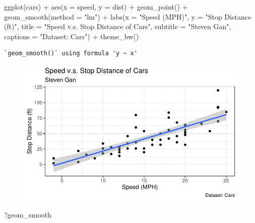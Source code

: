 \documentclass[
  letterpaper,
  DIV=11,
  numbers=noendperiod]{scrartcl}
\newenvironment{Shaded}{\begin{snugshade}}{\end{snugshade}}
\newcommand{\AttributeTok}[1]{\textcolor[rgb]{0.40,0.45,0.13}{#1}}
\newcommand{\FunctionTok}[1]{\textcolor[rgb]{0.28,0.35,0.67}{#1}}
\newcommand{\NormalTok}[1]{\textcolor[rgb]{0.00,0.23,0.31}{#1}}
\newcommand{\SpecialCharTok}[1]{\textcolor[rgb]{0.37,0.37,0.37}{#1}}
\newcommand{\StringTok}[1]{\textcolor[rgb]{0.13,0.47,0.30}{#1}}
\begin{document}
\begin{Shaded}
\begin{Highlighting}[]
\FunctionTok{ggplot}\NormalTok{(cars) }\SpecialCharTok{+} \FunctionTok{aes}\NormalTok{(}\AttributeTok{x =}\NormalTok{ speed, }\AttributeTok{y =}\NormalTok{ dist) }\SpecialCharTok{+} \FunctionTok{geom\_point}\NormalTok{() }\SpecialCharTok{+} \FunctionTok{geom\_smooth}\NormalTok{(}\AttributeTok{method =} \StringTok{"lm"}\NormalTok{) }\SpecialCharTok{+}
  \FunctionTok{labs}\NormalTok{(}\AttributeTok{x =} \StringTok{"Speed (MPH)"}\NormalTok{, }\AttributeTok{y =} \StringTok{"Stop Distance (ft)"}\NormalTok{,}
       \AttributeTok{title =} \StringTok{"Speed v.s. Stop Distance of Cars"}\NormalTok{,}
       \AttributeTok{subtitle =} \StringTok{"Steven Gan"}\NormalTok{,}
       \AttributeTok{captions =} \StringTok{"Dataset: Cars"}\NormalTok{) }\SpecialCharTok{+} \FunctionTok{theme\_bw}\NormalTok{()}
\end{Highlighting}
\end{Shaded}

\begin{verbatim}
`geom_smooth()` using formula 'y ~ x'
\end{verbatim}

\begin{figure}[H]

{\centering \includegraphics{class05_files/figure-pdf/unnamed-chunk-2-4.pdf}

}

\end{figure}

\begin{Shaded}
\begin{Highlighting}[]
\NormalTok{?geom\_smooth}
\end{Highlighting}
\end{Shaded}
\end{document}
